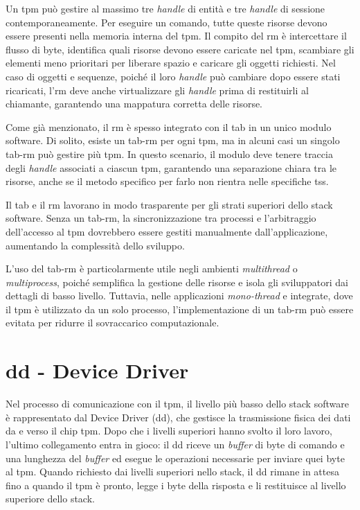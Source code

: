 Un \acrshort{tpm} può gestire al massimo tre \textit{handle} di entità e tre \textit{handle} di sessione contemporaneamente. Per eseguire un comando, tutte queste risorse devono essere presenti nella memoria interna del \acrshort{tpm}. Il compito del \acrshort{rm} è intercettare il flusso di byte, identifica quali risorse devono essere caricate nel \acrshort{tpm}, scambiare gli elementi meno prioritari per liberare spazio e caricare gli oggetti richiesti. Nel caso di oggetti e sequenze, poiché il loro \textit{handle} può cambiare dopo essere stati ricaricati, l'\acrshort{rm} deve anche virtualizzare gli \textit{handle} prima di restituirli al chiamante, garantendo una mappatura corretta delle risorse.

Come già menzionato, il \acrshort{rm} è spesso integrato con il \acrshort{tab} in un unico modulo software. Di solito, esiste un \acrshort{tab}-\acrshort{rm} per ogni \acrshort{tpm}, ma in alcuni casi un singolo \acrshort{tab}-\acrshort{rm} può gestire più \acrshort{tpm}. In questo scenario, il modulo deve tenere traccia degli \textit{handle} associati a ciascun \acrshort{tpm}, garantendo una separazione chiara tra le risorse, anche se il metodo specifico per farlo non rientra nelle specifiche \acrshort{tss}.

Il \acrshort{tab} e il \acrshort{rm} lavorano in modo trasparente per gli strati superiori dello stack software. Senza un \acrshort{tab}-\acrshort{rm}, la sincronizzazione tra processi e l'arbitraggio dell'accesso al \acrshort{tpm} dovrebbero essere gestiti manualmente dall'applicazione, aumentando la complessità dello sviluppo.

L'uso del \acrshort{tab}-\acrshort{rm} è particolarmente utile negli ambienti \textit{multithread} o \textit{multiprocess}, poiché semplifica la gestione delle risorse e isola gli sviluppatori dai dettagli di basso livello. Tuttavia, nelle applicazioni \textit{mono-thread} e integrate, dove il \acrshort{tpm} è utilizzato da un solo processo, l'implementazione di un \acrshort{tab}-\acrshort{rm} può essere evitata per ridurre il sovraccarico computazionale.

\section{\acrshort{dd} - Device Driver}\label{sec:dd}

Nel processo di comunicazione con il \acrshort{tpm}, il livello più basso dello stack software è rappresentato dal Device Driver (\acrshort{dd}), che gestisce la trasmissione fisica dei dati da e verso il chip \acrshort{tpm}. Dopo che i livelli superiori hanno svolto il loro lavoro, l'ultimo collegamento entra in gioco: il \acrshort{dd} riceve un \textit{buffer} di byte di comando e una lunghezza del \textit{buffer} ed esegue le operazioni necessarie per inviare quei byte al \acrshort{tpm}. Quando richiesto dai livelli superiori nello stack, il \acrshort{dd} rimane in attesa fino a quando il \acrshort{tpm} è pronto, legge i byte della risposta e li restituisce al livello superiore dello stack.

